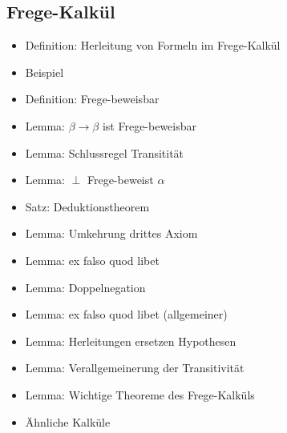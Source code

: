 \documentclass[8pt,fleqn,a4paper,twoside]{article}
\begin{document}
\begin{multicols}{2}
    \subsection{Frege-Kalkül} %
    \label{sub:frege_kalkül}
      \begin{itemize}
        \item Definition: Herleitung von Formeln im Frege-Kalkül
        \item Beispiel
        \item Definition: Frege-beweisbar
        \item Lemma: $β\to β$ ist Frege-beweisbar
        \item Lemma: Schlussregel Transitität
        \item Lemma: $\perp$ Frege-beweist $α$
        \item Satz: Deduktionstheorem
        \item Lemma: Umkehrung drittes Axiom
        \item Lemma: ex falso quod libet
        \item Lemma: Doppelnegation
        \item Lemma: ex falso quod libet (allgemeiner)
        \item Lemma: Herleitungen ersetzen Hypothesen
        \item Lemma: Verallgemeinerung der Transitivität
        \item Lemma: Wichtige Theoreme des Frege-Kalküls
        \item Ähnliche Kalküle
      \end{itemize}


\end{multicols}
\end{document}
